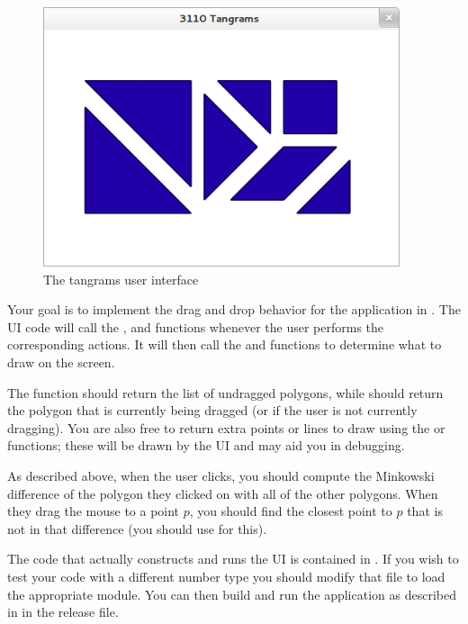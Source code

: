 \documentclass{pset}
\begin{document}
\begin{figure}
\begin{center}
\includegraphics[height=3in]{sshot.png}
\end{center}
\caption{The tangrams user interface}
\label{fig:sshot}
\end{figure}


Your goal is to implement the drag and drop behavior for the application in
.  The UI code will call the ,  and
 functions whenever the user performs the corresponding actions.
It will then call the  and  functions to
determine what to draw on the screen.

The  function should return the list of undragged polygons,
while  should return the polygon that is currently being
dragged (or  if the user is not currently dragging).  You are also
free to return extra points or lines to draw using the  or
 functions; these will be drawn by the UI and may aid you in
debugging.

As described above, when the user clicks, you should compute the Minkowski
difference of the polygon they clicked on with all of the other polygons.  When
they drag the mouse to a point $p$, you should find the closest point to $p$
that is not in that difference (you should use  for
this).

The code that actually constructs and runs the UI is contained in
.  If you wish to test your code with a different number type
you should modify that file to load the appropriate module.  You can then build
and run the application as described in  in the release
file.
\end{document}

